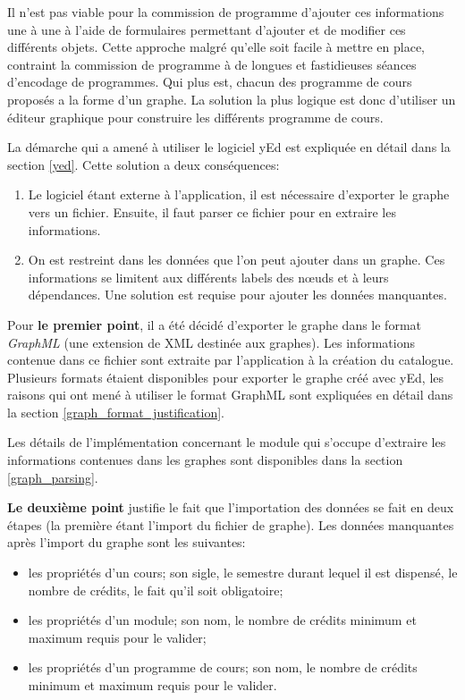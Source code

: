 Il n'est pas viable pour la commission de programme d'ajouter ces informations une à une à l'aide de formulaires permettant d'ajouter et de modifier ces différents objets. Cette approche malgré qu'elle soit facile à mettre en place, contraint la commission de programme à de longues et fastidieuses séances d'encodage de programmes. Qui plus est, chacun des programme de cours proposés a la forme d'un graphe. La solution la plus logique est donc d'utiliser un éditeur graphique pour construire les différents programme de cours.

La démarche qui a amené à utiliser le logiciel yEd est expliquée en détail dans la section \ref{yed}. Cette solution a deux conséquences:

\begin{enumerate}
  \item Le logiciel étant externe à l'application, il est nécessaire d'exporter le graphe vers un fichier. Ensuite, il faut parser ce fichier pour en extraire les informations.
  \item On est restreint dans les données que l'on peut ajouter dans un graphe. Ces informations se limitent aux différents labels des nœuds et à leurs dépendances. Une solution est requise pour ajouter les données manquantes. 
\end{enumerate}

Pour \textbf{le premier point}, il a été décidé d'exporter le graphe dans le format \textit{GraphML} (une extension de XML destinée aux graphes). Les informations contenue dans ce fichier sont extraite par l'application à la création du catalogue. Plusieurs formats étaient disponibles pour exporter le graphe créé avec yEd, les raisons qui ont mené à utiliser le format GraphML sont expliquées en détail dans la section \ref{graph_format_justification}.

Les détails de l'implémentation concernant le module qui s'occupe d'extraire les informations contenues dans les graphes sont disponibles dans la section \ref{graph_parsing}.

\textbf{Le deuxième point} justifie le fait que l'importation des données se fait en deux étapes (la première étant l'import du fichier de graphe). Les données manquantes après l'import du graphe sont les suivantes:

\begin{itemize}
  \item les propriétés d'un cours; son sigle, le semestre durant lequel il est dispensé, le nombre de crédits, le fait qu'il soit obligatoire;
  \item les propriétés d'un module; son nom, le nombre de crédits minimum et maximum requis pour le valider;
  \item les propriétés d'un programme de cours; son nom, le nombre de crédits minimum et maximum requis pour le valider.
\end{itemize}

